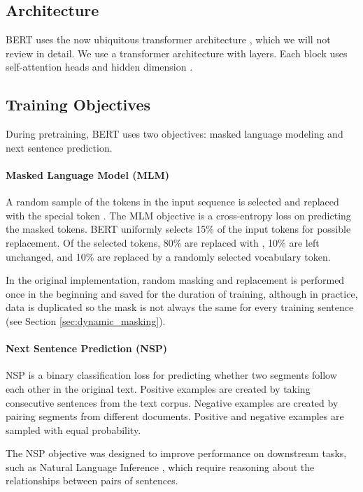 \documentclass[11pt]{article}
\begin{document}
\subsection{Architecture}
BERT uses the now ubiquitous transformer architecture \cite{vaswani2017attention}, which we will not review in detail. We use a transformer architecture with  layers. Each block uses  self-attention heads and hidden dimension .

\subsection{Training Objectives}

During pretraining, BERT uses two objectives: masked language modeling and next sentence prediction. 

\paragraph{Masked Language Model (MLM)} A random sample of the tokens in the input sequence is selected and replaced with the special token . The MLM objective is a cross-entropy loss on predicting the masked tokens. BERT uniformly selects 15\% of the input tokens for possible replacement. Of the selected tokens, 80\% are replaced with , 10\% are left unchanged, and 10\% are replaced by a randomly selected vocabulary token. 
    
In the original implementation, random masking and replacement is performed once in the beginning and saved for the duration of training, although in practice, data is duplicated so the mask is not always the same for every training sentence (see Section \ref{sec:dynamic_masking}).

\paragraph{Next Sentence Prediction (NSP)} NSP is a binary classification loss for predicting whether two segments follow each other in the original text. Positive examples are created by taking consecutive sentences from the text corpus. Negative examples are created by pairing segments from different documents. Positive and negative examples are sampled with equal probability. 
    
The NSP objective was designed to improve performance on downstream tasks, such as Natural Language Inference \cite{bowman2015large}, which require reasoning about the relationships between pairs of sentences. 
\end{document}
